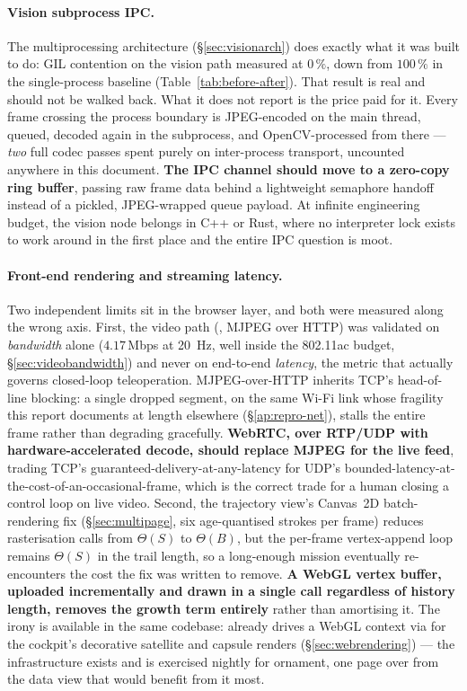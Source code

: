 \paragraph{Vision subprocess IPC.}
The multiprocessing  architecture (\S\ref{sec:visionarch}) does
exactly what it was built to do: GIL contention on the vision path measured
at $0\,\%$, down from $100\,\%$ in the single-process baseline
(Table~\ref{tab:before-after}). That result is real and should not be
walked back. What it does not report is the price paid for it. Every frame
crossing the process boundary is JPEG-encoded on the main thread, queued,
decoded again in the subprocess, and OpenCV-processed from there ---
\emph{two} full codec passes spent purely on inter-process transport,
uncounted anywhere in this document. \textbf{The IPC channel should move to
a zero-copy  ring buffer}, passing raw
frame data behind a lightweight semaphore handoff instead of a pickled,
JPEG-wrapped queue payload. At infinite engineering budget, the vision node
belongs in C++ or Rust, where no interpreter lock exists to work around in
the first place and the entire IPC question is moot.

\paragraph{Front-end rendering and streaming latency.}
Two independent limits sit in the browser layer, and both were measured
along the wrong axis. First, the video path
(, MJPEG over HTTP) was validated on
\emph{bandwidth} alone ($4.17$\,Mbps at 20~Hz, well inside the 802.11ac
budget, \S\ref{sec:videobandwidth}) and never on end-to-end
\emph{latency}, the metric that actually governs closed-loop
teleoperation. MJPEG-over-HTTP inherits TCP's head-of-line blocking: a
single dropped segment, on the same Wi-Fi link whose fragility this report
documents at length elsewhere (\S\ref{ap:repro-net}), stalls the entire
frame rather than degrading gracefully. \textbf{WebRTC, over RTP/UDP with
hardware-accelerated decode, should replace MJPEG for the live feed},
trading TCP's guaranteed-delivery-at-any-latency for UDP's
bounded-latency-at-the-cost-of-an-occasional-frame, which is the correct
trade for a human closing a control loop on live video. Second, the
trajectory view's Canvas~2D batch-rendering fix
(\S\ref{sec:multipage}, six age-quantised strokes per frame) reduces
rasterisation calls from $\Theta(S)$ to $\Theta(B)$, but the per-frame
vertex-append loop remains $\Theta(S)$ in the trail length, so a
long-enough mission eventually re-encounters the cost the fix was written
to remove. \textbf{A WebGL vertex buffer, uploaded incrementally and drawn
in a single call regardless of history length, removes the growth term
entirely} rather than amortising it. The irony is available in the same
codebase:  already drives a WebGL context via
 for the cockpit's decorative satellite and capsule
renders (\S\ref{sec:webrendering}) --- the
infrastructure exists and is exercised nightly for ornament, one page over
from the data view that would benefit from it most.


